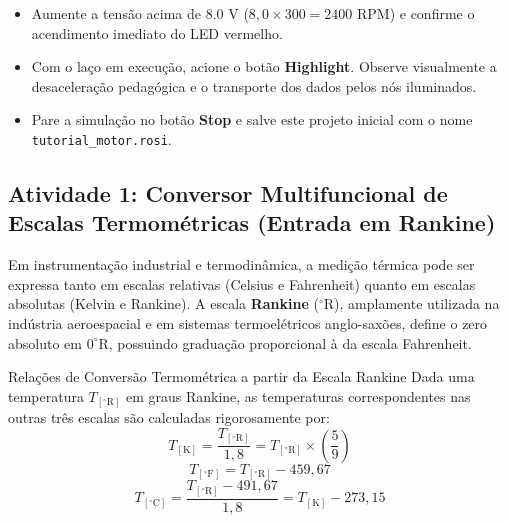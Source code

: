 \documentclass[11pt,a4paper]{article}
\begin{document}
\begin{enumerate}
\begin{itemize}
        \item Aumente a tensão acima de $8.0\text{ V}$ ($8{,}0 \times 300 = 2400\text{ RPM}$) e confirme o acendimento imediato do LED vermelho.
        \item Com o laço em execução, acione o botão \textbf{Highlight}. Observe visualmente a desaceleração pedagógica e o transporte dos dados pelos nós iluminados.
        \item Pare a simulação no botão \textbf{Stop} e salve este projeto inicial com o nome \texttt{tutorial\_motor.rosi}.
    \end{itemize}
\end{enumerate}

\vspace{0.1cm}

\subsection{Atividade 1: Conversor Multifuncional de Escalas Termométricas (Entrada em Rankine)}

Em instrumentação industrial e termodinâmica, a medição térmica pode ser expressa tanto em escalas relativas (Celsius e Fahrenheit) quanto em escalas absolutas (Kelvin e Rankine). A escala \textbf{Rankine} ($^\circ\text{R}$), amplamente utilizada na indústria aeroespacial e em sistemas termoelétricos anglo-saxões, define o zero absoluto em $0^\circ\text{R}$, possuindo graduação proporcional à da escala Fahrenheit.

\begin{didatictip}{Relações de Conversão Termométrica a partir da Escala Rankine}
Dada uma temperatura $T_{[^\circ\text{R}]}$ em graus Rankine, as temperaturas correspondentes nas outras três escalas são calculadas rigorosamente por:
\begin{equation}
    T_{[\text{K}]} = \frac{T_{[^\circ\text{R}]}}{1{,}8} = T_{[^\circ\text{R}]} \times \left(\frac{5}{9}\right)
    \label{eq:rankine_kelvin}
\end{equation}
\begin{equation}
    T_{[^\circ\text{F}]} = T_{[^\circ\text{R}]} - 459{,}67
    \label{eq:rankine_fahrenheit}
\end{equation}
\begin{equation}
    T_{[^\circ\text{C}]} = \frac{T_{[^\circ\text{R}]} - 491{,}67}{1{,}8} = T_{[\text{K}]} - 273{,}15
    \label{eq:rankine_celsius}
\end{equation}
\end{didatictip}
\end{document}
